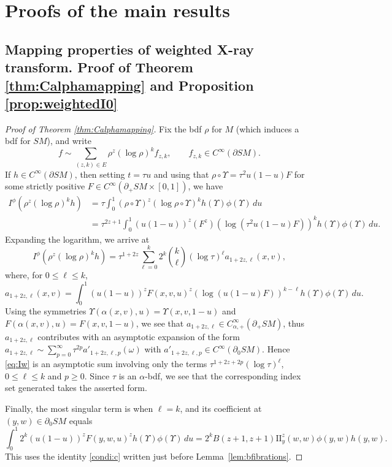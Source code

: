 \documentclass[11pt]{article}
\newcommand{\Subsection}{\subsection}
\theoremstyle{plain}
\theoremstyle{definition}
\theoremstyle{remark}
\def\two{\mathrm{II}}
\newcommand{\del}{\partial}
\begin{document}
\section{Proofs of the main results} \label{sec:proofmain}

\Subsection{Mapping properties of weighted X-ray transform. Proof of Theorem \ref{thm:Calphamapping} and Proposition \ref{prop:weightedI0}} \label{sec:proofmainXray}

\begin{proof}[Proof of Theorem \ref{thm:Calphamapping}] Fix the bdf $\rho$ for $M$ (which induces a bdf for $SM$), and write\vspace*{-3pt}
\begin{equation*}
f \sim \sum_{(z,k)\in E} \rho^z (\log \rho)^k f_{z,k}, \qquad f_{z,k}\in C^\infty(\partial SM).
\end{equation*}
If $h \in C^\infty(\partial SM)$, then setting $t = \tau u$ and using that $\rho\circ \Upsilon = \tau^2 u(1-u) F$ for
some strictly positive $F\in C^\infty(\partial_+ SM \times [0,1])$, we have\vspace*{-3pt}\enlargethispage{1\baselineskip}
\begin{align*}
I^\phi (\rho^z (\log \rho)^k h) &= \tau \int_0^1 (\rho\circ\Upsilon)^z (\log \rho\circ \Upsilon)^k h(\Upsilon) \phi(\Upsilon)\,du \\[-3pt]
&= \tau^{2z + 1} \int_0^1 (u(1-u))^z (F^z) (\log (\tau^2 u(1-u) F))^k h(\Upsilon) \phi(\Upsilon)\,du.
\end{align*}
Expanding the logarithm, we arrive at\vspace*{-5pt}
\begin{equation}
I^\phi (\rho^z (\log \rho)^k h) = \tau^{1+2z} \sum_{\ell=0}^k 2^k \binom{k}{\ell} (\log \tau)^\ell a_{1+2z, \ell}(x,v),
\label{eq:Iw}
\end{equation}
where, for $0\le \ell\le k$,\vspace*{-5pt}
\begin{equation*}
a_{1+2z, \ell}(x,v) = \int_0^1 (u(1-u))^z F(x,v,u)^z (\log(u(1-u)F))^{k-\ell} h(\Upsilon) \phi(\Upsilon)\,du.
\end{equation*}
Using the symmetries $\Upsilon(\alpha(x,v), u) = \Upsilon(x,v,1-u)$ and $F(\alpha(x,v),u) = F(x,v,1-u)$, we see that
$a_{1+2z,\ell} \in C^\infty_{\alpha,+}(\partial_{+}SM)$, thus $a_{1+2z,\ell}$ contributes with an asymptotic expansion of the form $a_{1+2z,\ell} \sim \sum_{p=0}^\infty \tau^{2p} a'_{1+2z,\ell,p}(\omega)$ with $a'_{1+2z,\ell,p}\in C^\infty(\partial_0 SM)$. Hence \eqref{eq:Iw} is an asymptotic sum involving only the terms $\tau^{1+2z+2p}(\log \tau)^\ell$, $0\le \ell\le k$ and $p\ge 0$. Since $\tau$ is an $\alpha$-bdf, we see that the corresponding index set generated takes the asserted form.

Finally, the most singular term is when $\ell = k$, and its coefficient at $(y,w) \in \del_0 SM$ equals\vspace*{-3pt}
\[
\int_0^1 \!\! 2^k (u(1-u))^z F(y,w,u)^z h(\Upsilon) \phi(\Upsilon)\, du = 2^k B(z+1, z+1) \two_y^z(w, w) \phi(y,w) h(y,w) .
\]
This uses the identity \eqref{condi:c} written just before Lemma~\ref{lem:bfibrations}.
\end{proof}
\end{document}
